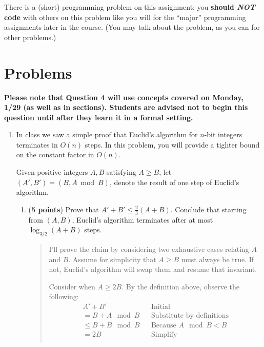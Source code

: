 \documentclass[11pt]{article}
\begin{document}
There is a (short) programming problem on this assignment; you {\bf should \textit{NOT} code} with others on
this problem like you will for the ``major'' programming assignments later in the course. (You may
talk about the problem, as you can for other problems.)


\section*{Problems}

\textbf{Please note that Question 4 will use concepts covered on Monday, 1/29 (as well as in sections). Students are advised not to begin this question until after they learn it in a formal setting.}

\begin{enumerate}[leftmargin=*]


\item In class we saw a simple proof that Euclid's algorithm for $n$-bit integers terminates in $O(n)$ steps. In this problem, you will provide a tighter bound on the constant factor in $O(n)$.

Given positive integers $A, B$ satisfying $A \ge B$, let $(A',B') = (B,A \bmod B)$, denote the result of one step of Euclid's algorithm.

\begin{enumerate}
    \item (\textbf{5 points}) Prove that $A' + B' \le \frac{2}{3}(A + B)$. Conclude that starting from $(A,B)$, Euclid's algorithm terminates after at most $\log_{3/2}(A+B)$ steps.
      \begin{quote}
        \color{purple}
        I'll prove the claim by considering two exhaustive cases relating $A$ and $B$. Assume for simplicity that $A \geq B$ must always be true. If not, Euclid's algorithm will swap them and resume that invariant. 

        \medskip
        Consider when $A \geq 2B$. By the definition above, observe the following: 
        \begin{align*}
            && A' + B' && \text{Initial} && \\
            && = B + A \mod B && \text{Substitute by definitions} && \\
            && \leq B + B \mod B && \text{Because $A \mod B < B$} && \\
            && = 2B && \text{Simplify} && \\
        \end{align*} 


\end{quote}
\end{enumerate}
\end{enumerate}
\end{document}
